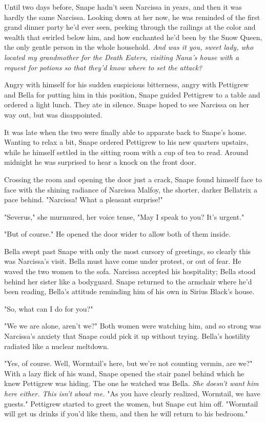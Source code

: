 Until two days before, Snape hadn't seen Narcissa in years, and then it was hardly the same Narcissa. Looking down at her now, he was reminded of the first grand dinner party he'd ever seen, peeking through the railings at the color and wealth that swirled below him, and how enchanted he'd been by the Snow Queen, the only gentle person in the whole household. \emph{And was it you, sweet lady, who located my grandmother for the Death Eaters, visiting Nana's house with a request for potions so that they'd know where to set the attack?}

Angry with himself for his sudden suspicious bitterness, angry with Pettigrew and Bella for putting him in this position, Snape guided Pettigrew to a table and ordered a light lunch. They ate in silence. Snape hoped to see Narcissa on her way out, but was disappointed.

It was late when the two were finally able to apparate back to Snape's home. Wanting to relax a bit, Snape ordered Pettigrew to his new quarters upstairs, while he himself settled in the sitting room with a cup of tea to read. Around midnight he was surprised to hear a knock on the front door.

Crossing the room and opening the door just a crack, Snape found himself face to face with the shining radiance of Narcissa Malfoy, the shorter, darker Bellatrix a pace behind. "Narcissa! What a pleasant surprise!"

"Severus," she murmured, her voice tense, "May I speak to you? It's urgent."

"But of course." He opened the door wider to allow both of them inside.

Bella swept past Snape with only the most cursory of greetings, so clearly this was Narcissa's visit. Bella must have come under protest, or out of fear. He waved the two women to the sofa. Narcissa accepted his hospitality; Bella stood behind her sister like a bodyguard. Snape returned to the armchair where he'd been reading, Bella's attitude reminding him of his own in Sirius Black's house.

"So, what can I do for you?"

"We{\el} we are alone, aren't we?" Both women were watching him, and so strong was Narcissa's anxiety that Snape could pick it up without trying. Bella's hostility radiated like a nuclear meltdown.

"Yes, of course. Well, Wormtail's here, but we're not counting vermin, are we?" With a lazy flick of his wand, Snape opened the stair panel behind which he knew Pettigrew was hiding. The one he watched was Bella. \emph{She doesn't want him here either. This isn't about me.} "As you have clearly realized, Wormtail, we have guests." Pettigrew started to greet the women, but Snape cut him off. "Wormtail will get us drinks if you'd like them, and then he will return to his bedroom."

